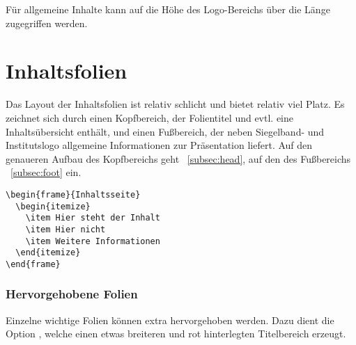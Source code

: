 \begin{Declaration}
\end{Declaration}

Für allgemeine Inhalte kann auf die Höhe des Logo-Bereichs über die Länge
 zugegriffen werden.

\section{Inhaltsfolien}

Das Layout der Inhaltsfolien ist relativ schlicht und bietet relativ viel Platz.
Es zeichnet sich durch einen Kopfbereich, der Folientitel und evtl. eine
Inhaltsübersicht enthält, und einen Fußbereich, der neben Siegelband- und
Institutslogo allgemeine Informationen zur Präsentation liefert.
Auf den genaueren Aufbau des Kopfbereichs geht \chaptername~\ref{subsec:head},
auf den des Fußbereichs \chaptername~\ref{subsec:foot} ein.

\begin{minipage}{0.5\textwidth}
\begin{verbatim}
\begin{frame}{Inhaltsseite}
  \begin{itemize}
    \item Hier steht der Inhalt
    \item Hier nicht
    \item Weitere Informationen
  \end{itemize}
\end{frame}
\end{verbatim}
\end{minipage}
\begin{minipage}{0.5\textwidth}
\end{minipage}

\subsubsection{Hervorgehobene Folien}

Einzelne wichtige Folien können extra hervorgehoben werden.
Dazu dient die Option ,
welche einen etwas breiteren und rot hinterlegten Titelbereich erzeugt.


